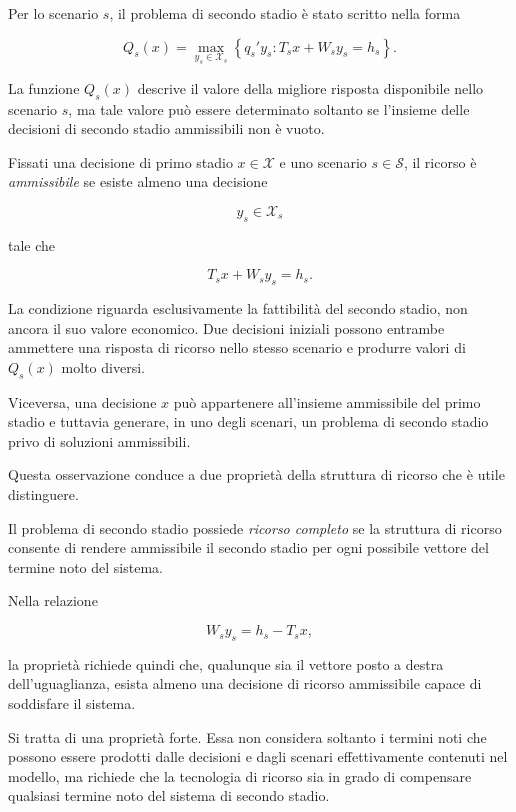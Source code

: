Per lo scenario $s$, il problema di secondo stadio \`e stato scritto nella
forma

\[
Q_s(x)
=
\max_{y_s\in\mathcal X_s}
\left\{
q_s'y_s:
T_sx+W_sy_s=h_s
\right\}.
\]

La funzione $Q_s(x)$ descrive il valore della migliore risposta disponibile
nello scenario $s$, ma tale valore pu\`o essere determinato soltanto se
l'insieme delle decisioni di secondo stadio ammissibili non \`e vuoto.

\begin{definition}

Fissati una decisione di primo stadio $x\in\mathcal X$ e uno scenario
$s\in\mathcal S$, il ricorso \`e \emph{ammissibile} se esiste almeno una
decisione

\[
y_s\in\mathcal X_s
\]

tale che

\[
T_sx+W_sy_s=h_s.
\]

\end{definition}

La condizione riguarda esclusivamente la fattibilit\`a del secondo stadio,
non ancora il suo valore economico. Due decisioni iniziali possono entrambe
ammettere una risposta di ricorso nello stesso scenario e produrre valori di
$Q_s(x)$ molto diversi.

Viceversa, una decisione $x$ pu\`o appartenere all'insieme ammissibile del
primo stadio e tuttavia generare, in uno degli scenari, un problema di secondo
stadio privo di soluzioni ammissibili.

Questa osservazione conduce a due propriet\`a della struttura di ricorso che
\`e utile distinguere.

\begin{definition}

Il problema di secondo stadio possiede \emph{ricorso completo} se la
struttura di ricorso consente di rendere ammissibile il secondo stadio per
ogni possibile vettore del termine noto del sistema.

Nella relazione

\[
W_sy_s=h_s-T_sx,
\]

la propriet\`a richiede quindi che, qualunque sia il vettore posto a destra
dell'uguaglianza, esista almeno una decisione di ricorso ammissibile capace
di soddisfare il sistema.

\end{definition}

Si tratta di una propriet\`a forte. Essa non considera soltanto i termini noti
che possono essere prodotti dalle decisioni e dagli scenari effettivamente
contenuti nel modello, ma richiede che la tecnologia di ricorso sia in grado
di compensare qualsiasi termine noto del sistema di secondo stadio.

